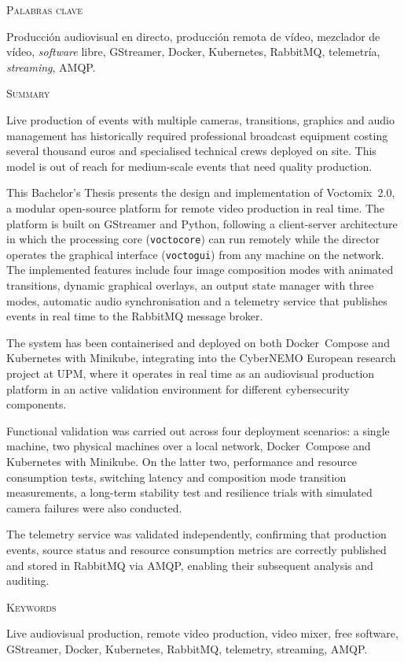 \vspace{0.5cm}
{\Large\textsc{\textcolor{nar}{Palabras clave}}}
\vspace{0.2cm}

Producción audiovisual en directo, producción remota de vídeo, mezclador de vídeo,
\textit{software} libre, GStreamer, Docker, Kubernetes, RabbitMQ, telemetría,
\textit{streaming}, AMQP.

\newpage
\thispagestyle{fancy}

{\Large\textsc{\textcolor{nar}{Summary}}}
\vspace{0.2cm}

Live production of events with multiple cameras, transitions, graphics and audio
management has historically required professional broadcast equipment costing
several thousand euros and specialised technical crews deployed on site. This model
is out of reach for medium-scale events that need quality production.

This Bachelor's Thesis presents the design and implementation of Voctomix~2.0, a
modular open-source platform for remote video production in real time. The platform
is built on GStreamer and Python, following a client-server architecture in which
the processing core (\texttt{voctocore}) can run remotely while the director
operates the graphical interface (\texttt{voctogui}) from any machine on the
network. The implemented features include four image composition modes with animated
transitions, dynamic graphical overlays, an output state manager with three modes,
automatic audio synchronisation and a telemetry service that publishes events
in real time to the RabbitMQ message broker.

The system has been containerised and deployed on both Docker~Compose and Kubernetes
with Minikube, integrating into the CyberNEMO European research project at UPM,
where it operates in real time as an audiovisual production platform in an active
validation environment for different cybersecurity components.

Functional validation was carried out across four deployment scenarios: a single
machine, two physical machines over a local network, Docker~Compose and Kubernetes
with Minikube. On the latter two, performance and resource consumption tests,
switching latency and composition mode transition measurements, a long-term
stability test and resilience trials with simulated camera failures were also
conducted.

The telemetry service was validated independently, confirming that production
events, source status and resource consumption metrics are correctly published and
stored in RabbitMQ via AMQP, enabling their subsequent analysis and auditing.

\vspace{0.5cm}
{\Large\textsc{\textcolor{nar}{Keywords}}}
\vspace{0.2cm}

Live audiovisual production, remote video production, video mixer, free software,
GStreamer, Docker, Kubernetes, RabbitMQ, telemetry, streaming, AMQP.

\newpage
